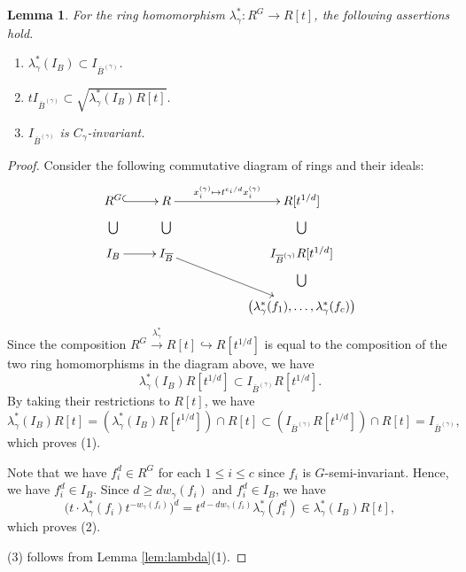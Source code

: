 \documentclass[a4paper,11pt]{amsart}
\newtheorem{lem}[thm]{Lemma}
\theoremstyle{definition}
\theoremstyle{remark}
\begin{document}
\begin{lem}\label{lem:incl}
For the ring homomorphism $\lambda^* _{\gamma} : R^G \to R[t]$, the following assertions hold. 
\begin{enumerate}
\item 
$\lambda ^* _{\gamma}(I_B) \subset I_{\overline{B}^{(\gamma)}}$.

\item 
$t I_{\overline{B}^{(\gamma)}} \subset \sqrt{\lambda ^* _{\gamma}(I_B) R[t]}$. 

\item
$I_{\overline{B}^{(\gamma)}}$ is $C_{\gamma}$-invariant.
\end{enumerate}
\end{lem}
\begin{proof}
Consider the following commutative diagram of rings and their ideals:
\[
\xymatrix{
R^G \ar@{^(->}[r] \ar@{}[d]|{\bigcup} & R \ar@{}[d]|{\bigcup} \ar[rr]^-{x_i^{(\gamma)} \mapsto t^{e_i/d} x_i^{(\gamma)}}&& R[t^{1/d}] \ar@{}[d]|{\bigcup} \\ 
I_B \ar[r] & I_{\overline{B}} \ar[drr] && I_{\overline{B}^{(\gamma)}} R[t^{1/d}] \ar@{}[d]|{\bigcup} \\
&&& \left( \lambda ^* _{\gamma}(f_1), \ldots , \lambda ^* _{\gamma}(f_c) \right)
}
\]
Since the composition $R^G \xrightarrow{\lambda ^* _{\gamma}} R[t] \hookrightarrow R[t^{1/d}]$ is equal to the composition of the two ring homomorphisms in the diagram above, we have
\[
\lambda ^* _{\gamma}(I_B) R[t^{1/d}] \subset I_{\overline{B}^{(\gamma)}} R[t^{1/d}]. 
\]
By taking their restrictions to $R[t]$, we have 
\[
\lambda ^* _{\gamma}(I_B) R[t]
= \left( \lambda ^* _{\gamma}(I_B) R[t^{1/d}] \right) \cap R[t] 
\subset \left(I_{\overline{B}^{(\gamma)}} R[t^{1/d}] \right) \cap R[t]
= I_{\overline{B}^{(\gamma)}}, 
\]
which proves (1). 

Note that we have $f_i^d \in R^G$ for each $1 \le i \le c$ since $f_i$ is $G$-semi-invariant. 
Hence, we have $f_i ^d \in I_B$. 
Since $d \ge d w _{\gamma} (f_i)$ and $f_i ^d \in I _B$, we have 
\[
\bigl( t \cdot \lambda ^* _{\gamma}(f_i)t^{-w_\gamma(f_i)} \bigr) ^d
= t^{d - d w _{\gamma} (f_i)} \lambda ^* _{\gamma}(f_i ^d)
\in \lambda ^* _{\gamma}(I_B) R[t], 
\]
which proves (2). 

(3) follows from Lemma \ref{lem:lambda}(1). 
\end{proof}
\end{document}
